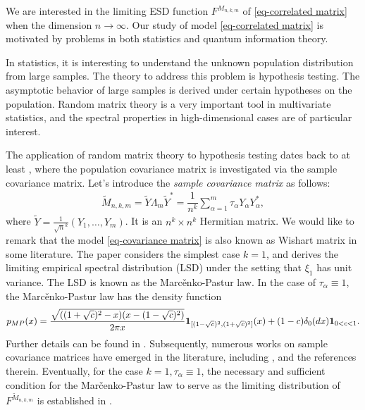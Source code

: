 \documentclass[12pt]{article}
\numberwithin{equation}{section} \theoremstyle{plain}
\begin{document}
We are interested in the limiting ESD function $F^{M_{n,k,m}}$ of \eqref{eq-correlated matrix} when the dimension $n \to \infty$.
Our study of model \eqref{eq-correlated matrix} is motivated by problems in both statistics and quantum information theory.

In statistics, it is interesting to understand the unknown population distribution from large samples. The theory to address this problem is hypothesis testing. 
The asymptotic behavior of large samples is derived under certain hypotheses on the population.
Random matrix theory is a very important tool in multivariate statistics, and the spectral properties in high-dimensional cases are of particular interest.

The application of random matrix theory to hypothesis testing dates back to at least \cite{MP67}, where the population covariance matrix is investigated via the sample covariance matrix.
Let's introduce the \emph{sample covariance matrix} as follows:
\begin{align}\label{eq-covariance matrix}
	\widetilde M_{n,k,m} = \widetilde Y \Lambda_m \widetilde Y^*
    = \dfrac{1}{n^k} \sum_{\alpha=1}^m \tau_{\alpha} Y_{\alpha} Y_{\alpha}^*,
\end{align}
where $\widetilde Y = \frac{1}{\sqrt{n}^k}  (Y_1,\ldots,Y_m)$.
It is an $n^k \times n^k$ Hermitian matrix.
We would like to remark that the model \eqref{eq-covariance matrix} is also known as Wishart matrix in some literature.
The paper \cite{MP67} considers the simplest case $k=1$, and derives the limiting empirical spectral distribution (LSD) under the setting that $\xi_1$ has unit variance. The LSD is known as the Marc\v{e}nko-Pastur law. In the case of $\tau_\alpha \equiv 1$, the Marc\v{e}nko-Pastur law has the density function
\begin{align} \label{eq-MP law}
    p_{MP}(x) = \dfrac{\sqrt{((1+\sqrt{c})^2-x)(x-(1-\sqrt{c})^2)}}{2\pi x} {\bf 1}_{[(1-\sqrt{c})^2,(1+\sqrt{c})^2]}(x) + (1-c) \delta_0(dx) {\bf 1}_{0<c<1}.
\end{align}
Further details can be found in \cites{Anderson2010, Bai2010}.
Subsequently, numerous works on sample covariance matrices have emerged in the literature, including \cites{BaiZhou08,Pajor09,Silv95}, and the references therein.
Eventually, for the case $k=1, \tau_\alpha \equiv 1$, the necessary and sufficient condition for the Mar\v{c}enko-Pastur law to serve as the limiting distribution of $F^{\widetilde M_{n,k,m}}$ is established in \cite{Yaskov2016}.
\end{document}
